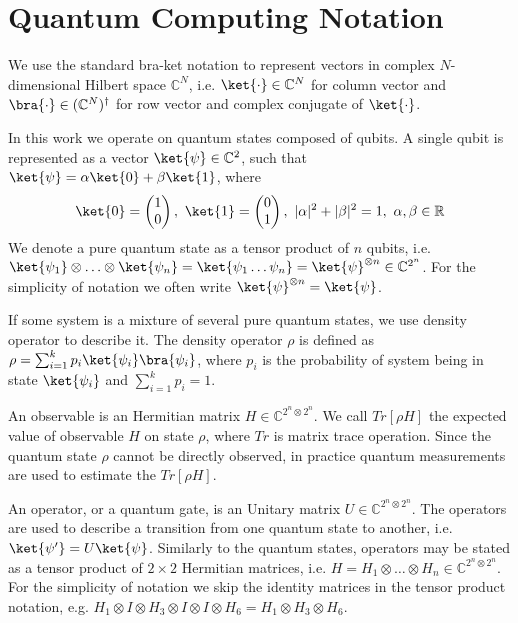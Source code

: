 \chapter{Quantum Computing Notation}\label{chapter:quantum_mechanic_introduction}
\enlargethispage{\baselineskip}
We use the standard bra-ket notation to represent vectors in complex
$N$-dimensional Hilbert space $\mathbb{C}^N$, i.e.
$\ket{\cdot} \in \mathbb{C}^N$ for column vector and $\bra{\cdot} \in
(\mathbb{C}^{N})^{\dagger}$ for row vector and complex conjugate of
$\ket{\cdot}$.

In this work we operate on quantum states composed of qubits. A single qubit is
represented as a vector $\ket{\psi} \in \mathbb{C}^2$, such that $\ket{\psi} =
\alpha\ket{0} + \beta\ket{1}$, where 
\begin{align*}
  \ket{0} = \begin{pmatrix}
    1 \\
    0 
  \end{pmatrix},\ 
  \ket{1} = \begin{pmatrix}
    0 \\
    1 
  \end{pmatrix},\ 
  |\alpha|^2 + |\beta|^2 = 1,\
  \alpha, \beta \in \mathbb{R}
\end{align*}
We denote a pure quantum state as a tensor product of $n$ qubits, i.e.
$\ket{\psi_1} \otimes \ldots \otimes \ket{\psi_n} = \ket{\psi_1 \ldots \psi_n} =
\ket{\psi}^{\otimes n} \in
\mathbb{C}^{2^n}$. For the simplicity of notation we often write
$\ket{\psi}^{\otimes n} = \ket{\psi}$.

If some system is a mixture of several pure quantum states, we use density
operator to describe it. The density operator $\rho$ is defined as $\rho =
\sum_{i=1}^{k}p_i\ket{\psi_i}\bra{\psi_i}$, where $p_i$ is the probability of
system being in state $\ket{\psi_i}$ and $\sum_{i=1}^kp_i = 1$.

An observable is an Hermitian matrix $H \in \mathbb{C}^{2^n \otimes 2^n}$. We
call $Tr[\rho H]$ the expected value of observable $H$ on state $\rho$, where
$Tr$ is matrix trace operation. Since the quantum state $\rho$ cannot be directly
observed, in practice quantum measurements \cite{10.5555/1972505} are used to
estimate the $Tr[\rho H]$.

An operator, or a quantum gate, is an Unitary matrix $U \in \mathbb{C}^{2^n
  \otimes 2^n}$. The operators are used to describe a transition from one
quantum state to another, i.e. $\ket{\psi'} = U\ket{\psi}$.
Similarly to the quantum states, operators may be stated as a tensor
product of $2 \times 2$ Hermitian matrices, i.e. $H = H_1 \otimes \ldots \otimes
H_n \in \mathbb{C}^{2^n \otimes 2^n}$. For the simplicity of notation we skip the
identity matrices in the tensor product notation, e.g. $H_1 \otimes I \otimes H_3
\otimes I \otimes I \otimes H_6 = H_1 \otimes H_3 \otimes H_6$.

